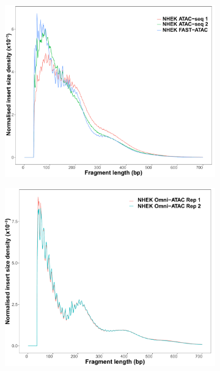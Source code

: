 \begin{figure}[htbp]
\centering
\begin{subfigure}{0.48\textwidth}
\centering
\includegraphics[width=\textwidth]{./Results1/pdfs/ATAC_NHEK_ATAC1_ATAC2_FAST_ATAC_fragment_size_distribution}
\caption{\textbf{}}
\end{subfigure}%
\begin{subfigure}{0.48\textwidth}
\centering
\includegraphics[width=\textwidth]{./Results1/pdfs/ATAC_NHEK_Omni_ATAC_fragment_size_distribution}
\caption{\textbf{}}
\end{subfigure}

\end{figure}
